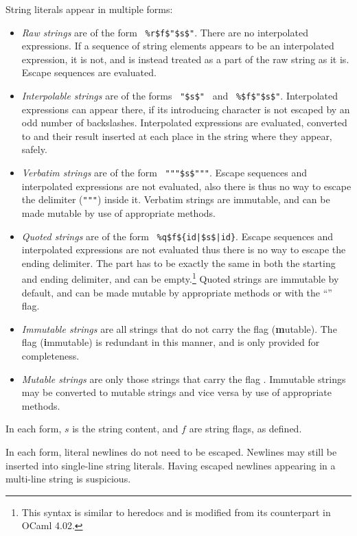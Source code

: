 String literals appear in multiple forms:
\begin{itemize}
  \item {\em Raw strings} are of the form ~\lstinline!%r$f$"$s$"!. There are no interpolated expressions. If a sequence of string elements appears to be an interpolated expression, it is not, and is instead treated as a part of the raw string as it is. Escape sequences are evaluated. 
  \item {\em Interpolable strings} are of the forms ~\lstinline!"$s$"!~ and ~\lstinline!%$f$"$s$"!. Interpolated expressions can appear there, if its introducing character is not escaped by an odd number of backslashes. Interpolated expressions are evaluated, converted to  and their result inserted at each place in the string where they appear, safely. 
  \item {\em Verbatim strings} are of the form ~\lstinline!"""$s$"""!. Escape sequences and interpolated expressions are not evaluated, also there is thus no way to escape the delimiter (\lstinline!"""!) inside it. Verbatim strings are immutable, and can be made mutable by use of appropriate methods. 
  \item {\em Quoted strings} are of the form ~\lstinline!%q$f${id|$s$|id}!. Escape sequences and interpolated expressions are not evaluated thus there is no way to escape the ending delimiter. The  part has to be exactly the same in both the starting and ending delimiter, and can be empty.\footnote{This syntax is similar to heredocs and is modified from its counterpart in OCaml 4.02.} Quoted strings are immutable by default, and can be made mutable by appropriate methods or with the ``'' flag.
  \item {\em Immutable strings} are all strings that do not carry the flag  (\textbf{m}utable). The flag  (\textbf{i}mmutable) is redundant in this manner, and is only provided for completeness. 
  \item {\em Mutable strings} are only those strings that carry the flag . Immutable strings may be converted to mutable strings and vice versa by use of appropriate methods. 
\end{itemize}

In each form, $s$ is the string content, and $f$ are string flags, as defined. 

In each form, literal newlines do not need to be escaped. Newlines may still be inserted into single-line string literals. Having escaped newlines appearing in a multi-line string is suspicious. 





